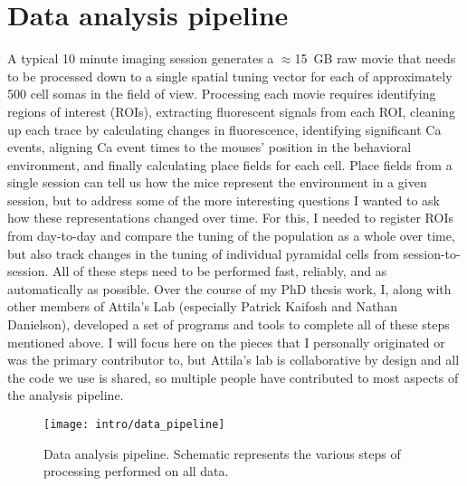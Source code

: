 \section{Data analysis pipeline}
\label{sec:intro:techniques:pipeline}
A typical 10 minute imaging session generates a $\approx$15~GB raw movie that needs to be processed down to a single spatial tuning vector for each of approximately 500 cell somas in the field of view.
Processing each movie requires identifying regions of interest (ROIs), extracting fluorescent signals from each ROI, cleaning up each trace by calculating changes in fluorescence, identifying significant Ca events, aligning Ca event times to the mouses' position in the behavioral environment, and finally calculating place fields for each cell.
Place fields from a single session can tell us how the mice represent the environment in a given session, but to address some of the more interesting questions I wanted to ask how these representations changed over time.
For this, I needed to register ROIs from day-to-day and compare the tuning of the population as a whole over time, but also track changes in the tuning of individual pyramidal cells from session-to-session.
All of these steps need to be performed fast, reliably, and as automatically as possible.
Over the course of my PhD thesis work, I, along with other members of Attila's Lab (especially Patrick Kaifosh and Nathan Danielson), developed a set of programs and tools to complete all of these steps mentioned above.
I will focus here on the pieces that I personally originated or was the primary contributor to, but Attila's lab is collaborative by design and all the code we use is shared, so multiple people have contributed to most aspects of the analysis pipeline.

\begin{figure}
	\centering
	\texttt{[image: intro/data\_pipeline]}
	\caption[Data analysis pipeline]{Data analysis pipeline. Schematic represents the various steps of processing performed on all data.}
	\label{fig:intro:techniques:pipeline}
\end{figure}

